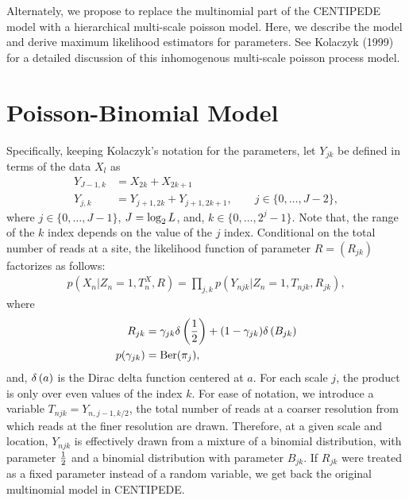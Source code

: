\documentclass[reqno]{amsart}
\numberwithin{equation}{section}
\begin{document}
Alternately, we propose to replace the multinomial part of the CENTIPEDE model with a hierarchical multi-scale poisson model. 
Here, we describe the model and derive maximum likelihood estimators for parameters. 
See Kolaczyk (1999) for a detailed discussion of this inhomogenous multi-scale poisson process model. 

\section{Poisson-Binomial Model}
Specifically, keeping Kolaczyk's notation for the parameters, let $Y_{jk}$ be defined in terms of the data $X_l$ as
\begin{align}
    Y_{J-1,k} &= X_{2k}+X_{2k+1} \\
    Y_{j,k} &= Y_{j+1,2k}+Y_{j+1,2k+1}, \qquad j \in \{0,\ldots,J-2\},
\end{align}
where $j \in \{0,\ldots,J-1\}$, $J=\log_2{L}$, and, $k \in \{0,\ldots,2^{j}-1\}$. Note that, the
range of the $k$ index depends on the value of the $j$ index. Conditional on the total number of reads 
at a site, the likelihood function of parameter $R = (R_{jk})$ factorizes as follows:
\begin{align}
    p(X_n | Z_n=1, T^X_n, R) = \prod_{j,k} p(Y_{njk} | Z_n=1, T_{njk}, R_{jk}),
\end{align}
where
\begin{align}
    R_{jk} &= \gamma_{jk} \delta \left(\frac{1}{2} \right) + (1 - \gamma_{jk}) \delta \left(B_{jk} \right) \\
    p(\gamma_{jk}) &= \mathrm{Ber}(\pi_j), \\
\end{align}
and, $\delta \left(a \right)$ is the Dirac delta function centered at $a$. For each scale $j$, the product is only 
over even values of the index $k$. For ease of notation, we introduce a variable $T_{njk} = Y_{n,j-1,k/2}$, the 
total number of reads at a coarser resolution from which reads at the finer resolution are
drawn. Therefore, at a given scale and location, $Y_{njk}$ is effectively drawn from a mixture of
a binomial distribution, with parameter $\frac{1}{2}$ and a binomial distribution with parameter $B_{jk}$.
If $R_{jk}$ were treated as a fixed parameter instead of a random variable, we get back the
original multinomial model in CENTIPEDE.
\end{document}
